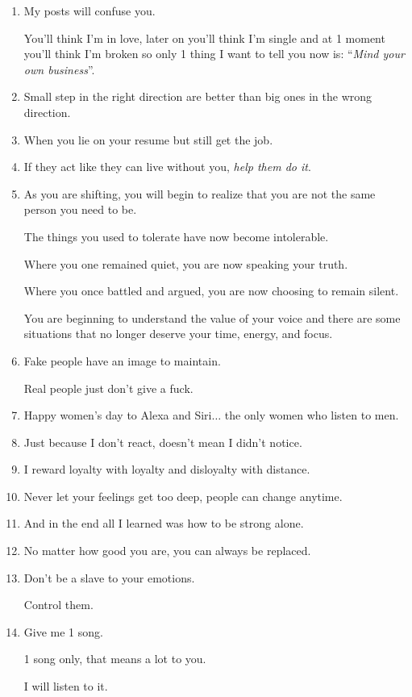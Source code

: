 \documentclass{article}
\numberwithin{equation}{section}
\begin{document}
\begin{enumerate}
    She can finance herself!
    \item My posts will confuse you.
    
    You'll think I'm in love, later on you'll think I'm single and at 1 moment you'll think I'm broken so only 1 thing I want to tell you now is: ``\textit{Mind your own business}''.
    \item Small step in the right direction are better than big ones in the wrong direction.
    \item When you lie on your resume but still get the job.
    \item If they act like they can live without you, \textit{help them do it}.
    \item As you are shifting, you will begin to realize that you are not the same person you need to be.
    
    The things you used to tolerate have now become intolerable.
    
    Where you one remained quiet, you are now speaking your truth.
    
    Where you once battled and argued, you are now choosing to remain silent.
    
    You are beginning to understand the value of your voice and there are some situations that no longer deserve your time, energy, and focus.
    \item Fake people have an image to maintain.
    
    Real people just don't give a fuck.
    \item Happy women's day to Alexa and Siri$\ldots$ the only women who listen to men.
    \item Just because I don't react, doesn't mean I didn't notice.
    \item I reward loyalty with loyalty and disloyalty with distance.
    \item Never let your feelings get too deep, people can change anytime.
    \item And in the end all I learned was how to be strong alone.
    \item No matter how good you are, you can always be replaced.
    \item Don't be a slave to your emotions.
    
    Control them.
    \item Give me 1 song.
    
    1 song only, that means a lot to you.
    
    I will listen to it.
    

\end{enumerate}
\end{document}
